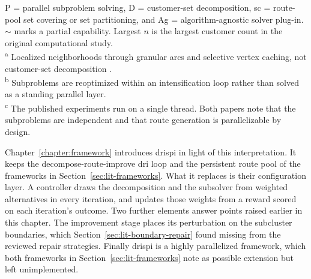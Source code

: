 \begin{table}[!b]
  \medskip
  \begin{minipage}{\linewidth}
    \footnotesize
    P = parallel subproblem solving, D = customer-set decomposition, \gls{sc} = route-pool set covering or set partitioning, and Ag = algorithm-agnostic solver plug-in. $\sim$ marks a partial capability. Largest $n$ is the largest customer count in the original computational study.\\
    
    \textsuperscript{a} Localized neighborhoods through granular arcs and selective vertex caching, not customer-set decomposition \citep{accorsiFastScalableHeuristic2021,tothGranularTabuSearch2003}.\\
    \textsuperscript{b} Subproblems are reoptimized within an intensification loop rather than solved as a standing parallel layer.\\
    \textsuperscript{c} The published experiments run on a single thread. Both papers note that the subproblems are independent and that route generation is parallelizable by design.
  \end{minipage}
\end{table}

Chapter~\ref{chapter:framework} introduces \gls{drispi} in light of this interpretation. It keeps the decompose-route-improve \gls{dri} loop and the persistent route pool of the frameworks in Section~\ref{sec:lit-frameworks}. What it replaces is their configuration layer. A controller draws the decomposition and the subsolver from weighted alternatives in every iteration, and updates those weights from a reward scored on each iteration's outcome. Two further elements answer points raised earlier in this chapter. The improvement stage places its perturbation on the subcluster boundaries, which Section~\ref{sec:lit-boundary-repair} found missing from the reviewed repair strategies. Finally \gls{drispi} is a highly parallelized framework, which both frameworks in Section~\ref{sec:lit-frameworks} note as possible extension but left unimplemented.
